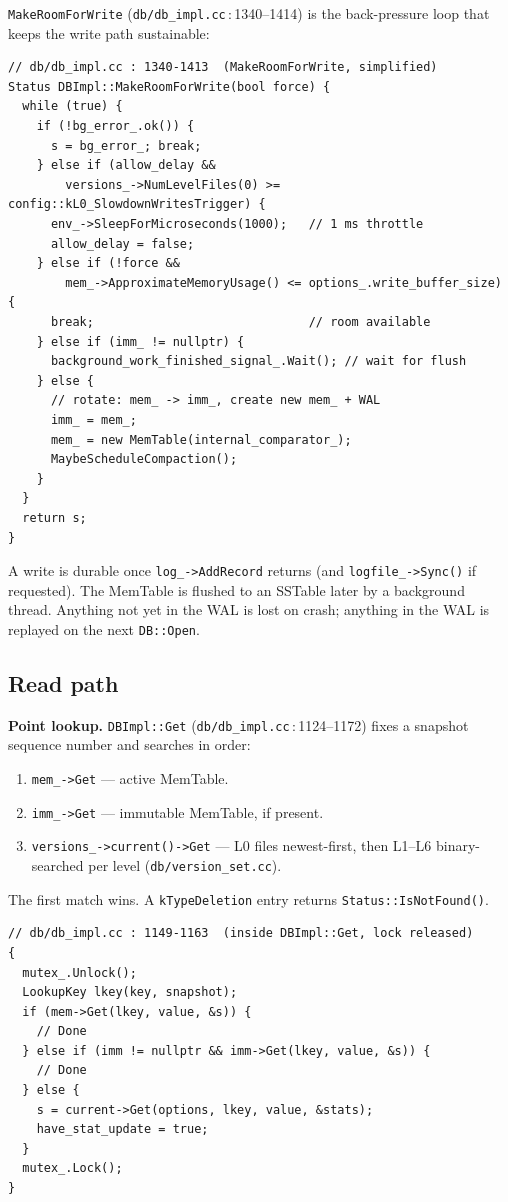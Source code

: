 \documentclass[11pt,a4paper]{article}
\newcommand{\codref}[2]{\textcolor{accent}{\texttt{\small#1}}\,$\!:\!$\textcolor{primary!70!black}{\small#2}}
\newcommand{\fname}[1]{\textcolor{primary!85!black}{\texttt{#1}}}
\newcommand{\sym}[1]{\texttt{#1}}
\begin{document}
\fname{MakeRoomForWrite} (\codref{db/db\_impl.cc}{1340--1414}) is the
back-pressure loop that keeps the write path sustainable:

\begin{lstlisting}
// db/db_impl.cc : 1340-1413  (MakeRoomForWrite, simplified)
Status DBImpl::MakeRoomForWrite(bool force) {
  while (true) {
    if (!bg_error_.ok()) {
      s = bg_error_; break;
    } else if (allow_delay &&
        versions_->NumLevelFiles(0) >= config::kL0_SlowdownWritesTrigger) {
      env_->SleepForMicroseconds(1000);   // 1 ms throttle
      allow_delay = false;
    } else if (!force &&
        mem_->ApproximateMemoryUsage() <= options_.write_buffer_size) {
      break;                              // room available
    } else if (imm_ != nullptr) {
      background_work_finished_signal_.Wait(); // wait for flush
    } else {
      // rotate: mem_ -> imm_, create new mem_ + WAL
      imm_ = mem_;
      mem_ = new MemTable(internal_comparator_);
      MaybeScheduleCompaction();
    }
  }
  return s;
}
\end{lstlisting}

\begin{designnote}[Durability]
A write is durable once \sym{log\_->AddRecord} returns (and
\sym{logfile\_->Sync()} if requested). The MemTable is flushed to an SSTable
later by a background thread. Anything not yet in the WAL is lost on crash;
anything in the WAL is replayed on the next \sym{DB::Open}.
\end{designnote}

\subsection{Read path}

\textbf{Point lookup.} \sym{DBImpl::Get} (\codref{db/db\_impl.cc}{1124--1172})
fixes a snapshot sequence number and searches in order:
\begin{enumerate}[leftmargin=1.6em,itemsep=1pt]
    \item \sym{mem\_->Get} --- active MemTable.
    \item \sym{imm\_->Get} --- immutable MemTable, if present.
    \item \sym{versions\_->current()->Get} --- L0 files newest-first,
          then L1--L6 binary-searched per level (\fname{db/version\_set.cc}).
\end{enumerate}
The first match wins. A \sym{kTypeDeletion} entry returns
\sym{Status::IsNotFound()}.

\begin{lstlisting}
// db/db_impl.cc : 1149-1163  (inside DBImpl::Get, lock released)
{
  mutex_.Unlock();
  LookupKey lkey(key, snapshot);
  if (mem->Get(lkey, value, &s)) {
    // Done
  } else if (imm != nullptr && imm->Get(lkey, value, &s)) {
    // Done
  } else {
    s = current->Get(options, lkey, value, &stats);
    have_stat_update = true;
  }
  mutex_.Lock();
}
\end{lstlisting}
\end{document}
